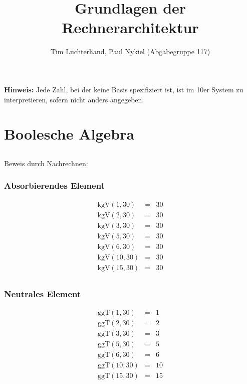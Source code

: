 \documentclass[DIN, pagenumber=false, fontsize=11pt, parskip=half]{scrartcl}
\title{Grundlagen der Rechnerarchitektur}
\author{Tim Luchterhand, Paul Nykiel (Abgabegruppe 117)}
\newcommand{\boolshitKgV}[1]{\text{kgV}(#1,30) &=& 30\\}
\newcommand{\boolshitggT}[1]{\text{ggT}(#1,30) &=& #1\\}
\begin{document}
    \maketitle
    \textbf{Hinweis: } Jede Zahl, bei der keine Basis spezifiziert ist, ist im 10er System zu interpretieren, sofern nicht anders angegeben.
    \section{Boolesche Algebra}
    \subsection{}
    Beweis durch Nachrechnen:
    \subsubsection{Absorbierendes Element}
    \begin{eqnarray*}
        \boolshitKgV{1}
        \boolshitKgV{2}
        \boolshitKgV{3}
        \boolshitKgV{5}
        \boolshitKgV{6}
        \boolshitKgV{10}
        \boolshitKgV{15}
    \end{eqnarray*}
    \subsubsection{Neutrales Element}
    \begin{eqnarray*}
        \boolshitggT{1}
        \boolshitggT{2}
        \boolshitggT{3}
        \boolshitggT{5}
        \boolshitggT{6}
        \boolshitggT{10}
        \boolshitggT{15}
    \end{eqnarray*}
\end{document}

